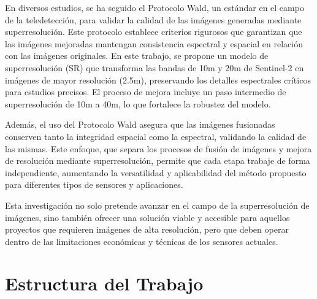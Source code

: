 En diversos estudios, se ha seguido el Protocolo Wald, un estándar en el campo de la teledetección, para validar la calidad de las imágenes generadas mediante superresolución. Este protocolo establece criterios rigurosos que garantizan que las imágenes mejoradas mantengan consistencia espectral y espacial en relación con las imágenes originales. En este trabajo, se propone un modelo de superresolución (SR) que transforma las bandas de 10m y 20m de Sentinel-2 en imágenes de mayor resolución (2.5m), preservando los detalles espectrales críticos para estudios precisos. El proceso de mejora incluye un paso intermedio de superresolución de 10m a 40m, lo que fortalece la robustez del modelo.

Además, el uso del Protocolo Wald asegura que las imágenes fusionadas conserven tanto la integridad espacial como la espectral, validando la calidad de las mismas. Este enfoque, que separa los procesos de fusión de imágenes y mejora de resolución mediante superresolución, permite que cada etapa trabaje de forma independiente, aumentando la versatilidad y aplicabilidad del método propuesto para diferentes tipos de sensores y aplicaciones.

Esta investigación no solo pretende avanzar en el campo de la superresolución de imágenes, sino también ofrecer una solución viable y accesible para aquellos proyectos que requieren imágenes de alta resolución, pero que deben operar dentro de las limitaciones económicas y técnicas de los sensores actuales.

\section{Estructura del Trabajo}

